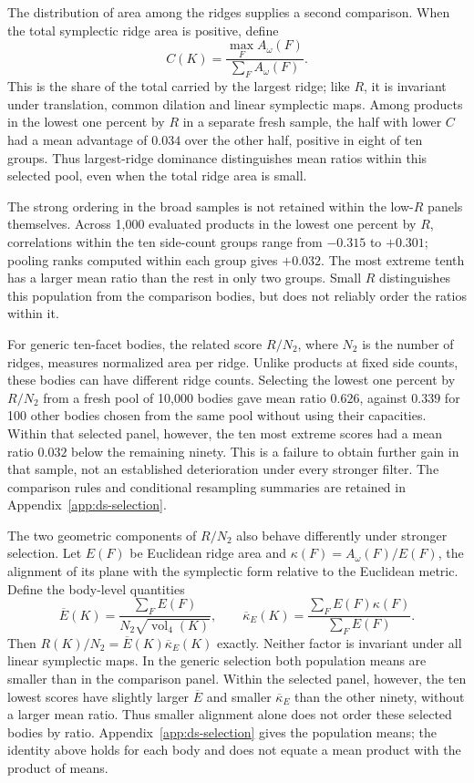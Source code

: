 The distribution of area among the ridges supplies a second comparison.
When the total symplectic ridge area is positive, define
\[
 C(K)=\frac{\max_F A_\omega(F)}{\sum_F A_\omega(F)}.
\]
This is the share of the total carried by the largest ridge; like $R$,
it is invariant under translation, common dilation and linear symplectic
maps. Among products in the
lowest one percent by $R$ in a separate fresh sample, the half with lower
$C$ had a mean advantage of $0.034$ over the other half, positive in eight
of ten groups. Thus largest-ridge dominance distinguishes mean ratios within this
selected pool, even when the total ridge area is small.

The strong ordering in the broad samples is not retained within the
low-$R$ panels themselves. Across 1,000 evaluated products in the lowest
one percent by $R$, correlations within the ten side-count groups range
from $-0.315$ to $+0.301$; pooling ranks computed within each group gives
$+0.032$. The most extreme tenth has a larger mean ratio than the rest
in only two groups. Small $R$ distinguishes this population from the
comparison bodies, but does not reliably order the ratios within it.

For generic ten-facet bodies, the related score $R/N_2$, where $N_2$ is
the number of ridges, measures normalized area per ridge. Unlike products
at fixed side counts, these bodies can have different ridge counts.
Selecting the lowest one percent by $R/N_2$ from a fresh pool of 10,000
bodies gave mean ratio $0.626$, against $0.339$ for 100 other bodies
chosen from the same pool without using their capacities. Within that selected panel, however,
the ten most extreme scores had a mean ratio $0.032$ below the remaining
ninety. This is a failure to obtain further gain in that sample, not an
established deterioration under every stronger filter. The comparison
rules and conditional resampling summaries are retained in
Appendix~\ref{app:ds-selection}.

The two geometric components of $R/N_2$ also behave differently under
stronger selection. Let $E(F)$ be Euclidean ridge area and
$\kappa(F)=A_\omega(F)/E(F)$, the alignment of its plane with the
symplectic form relative to the Euclidean metric. Define the body-level
quantities
\[
 \overline E(K)=\frac{\sum_F E(F)}{N_2\sqrt{\operatorname{vol}_4(K)}},
 \qquad
 \overline\kappa_E(K)=\frac{\sum_F E(F)\kappa(F)}{\sum_F E(F)}.
\]
Then $R(K)/N_2=\overline E(K)\overline\kappa_E(K)$ exactly. Neither
factor is invariant under all linear symplectic maps. In the generic
selection both population means are smaller than in the comparison panel.
Within the selected panel, however, the ten lowest scores have slightly
larger $\overline E$ and smaller $\overline\kappa_E$ than the other
ninety, without a larger mean ratio. Thus smaller alignment alone does
not order these selected bodies by ratio. Appendix~\ref{app:ds-selection}
gives the population means; the identity above holds for each body and
does not equate a mean product with the product of means.

